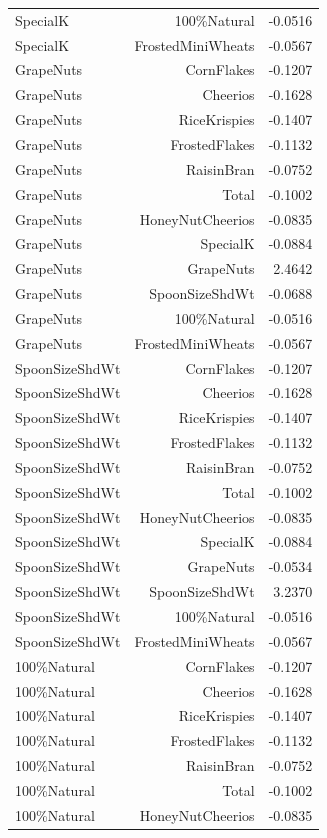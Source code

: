 \begin{longtable}{@{}lrr@{}}
SpecialK & 100\%Natural & -0.0516 \\
SpecialK & FrostedMiniWheats & -0.0567 \\
GrapeNuts & CornFlakes & -0.1207 \\
GrapeNuts & Cheerios & -0.1628 \\
GrapeNuts & RiceKrispies & -0.1407 \\
GrapeNuts & FrostedFlakes & -0.1132 \\
GrapeNuts & RaisinBran & -0.0752 \\
GrapeNuts & Total & -0.1002 \\
GrapeNuts & HoneyNutCheerios & -0.0835 \\
GrapeNuts & SpecialK & -0.0884 \\
GrapeNuts & GrapeNuts & 2.4642 \\
GrapeNuts & SpoonSizeShdWt & -0.0688 \\
GrapeNuts & 100\%Natural & -0.0516 \\
GrapeNuts & FrostedMiniWheats & -0.0567 \\
SpoonSizeShdWt & CornFlakes & -0.1207 \\
SpoonSizeShdWt & Cheerios & -0.1628 \\
SpoonSizeShdWt & RiceKrispies & -0.1407 \\
SpoonSizeShdWt & FrostedFlakes & -0.1132 \\
SpoonSizeShdWt & RaisinBran & -0.0752 \\
SpoonSizeShdWt & Total & -0.1002 \\
SpoonSizeShdWt & HoneyNutCheerios & -0.0835 \\
SpoonSizeShdWt & SpecialK & -0.0884 \\
SpoonSizeShdWt & GrapeNuts & -0.0534 \\
SpoonSizeShdWt & SpoonSizeShdWt & 3.2370 \\
SpoonSizeShdWt & 100\%Natural & -0.0516 \\
SpoonSizeShdWt & FrostedMiniWheats & -0.0567 \\
100\%Natural & CornFlakes & -0.1207 \\
100\%Natural & Cheerios & -0.1628 \\
100\%Natural & RiceKrispies & -0.1407 \\
100\%Natural & FrostedFlakes & -0.1132 \\
100\%Natural & RaisinBran & -0.0752 \\
100\%Natural & Total & -0.1002 \\
100\%Natural & HoneyNutCheerios & -0.0835 \\

\end{longtable}
